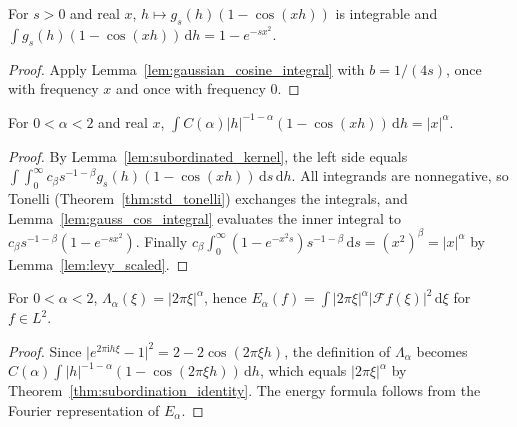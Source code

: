 \begin{lemma}\label{lem:gauss_cos_integral}
\leanok
For $s > 0$ and real $x$, $h \mapsto g_s(h)(1 - \cos(xh))$ is integrable and $\int g_s(h)(1 - \cos(xh))\, \mathrm{d}h = 1 - e^{-s x^2}$.
\end{lemma}

\begin{proof}
\leanok
Apply Lemma~\ref{lem:gaussian_cosine_integral} with $b = 1/(4s)$, once with frequency $x$ and once with frequency $0$.
\end{proof}

\begin{theorem}\label{thm:subordination_identity}
\leanok
For $0 < \alpha < 2$ and real $x$, $\int C(\alpha) \lvert h \rvert^{-1-\alpha} (1 - \cos(xh))\, \mathrm{d}h = \lvert x \rvert^\alpha$.
\end{theorem}

\begin{proof}
\leanok
By Lemma~\ref{lem:subordinated_kernel}, the left side equals $\int \int_0^\infty c_\beta s^{-1-\beta} g_s(h)(1 - \cos(xh))\, \mathrm{d}s\, \mathrm{d}h$. All integrands are nonnegative, so Tonelli (Theorem~\ref{thm:std_tonelli}) exchanges the integrals, and Lemma~\ref{lem:gauss_cos_integral} evaluates the inner integral to $c_\beta s^{-1-\beta}(1 - e^{-s x^2})$. Finally $c_\beta \int_0^\infty (1 - e^{-x^2 s}) s^{-1-\beta}\, \mathrm{d}s = (x^2)^\beta = \lvert x \rvert^\alpha$ by Lemma~\ref{lem:levy_scaled}.
\end{proof}

\begin{theorem}\label{thm:exact_symbol}
\leanok
For $0 < \alpha < 2$, $\Lambda_\alpha(\xi) = \lvert 2\pi\xi \rvert^\alpha$, hence $E_\alpha(f) = \int \lvert 2\pi\xi \rvert^\alpha \lvert \mathcal{F} f(\xi) \rvert^2\, \mathrm{d}\xi$ for $f \in L^2$.
\end{theorem}

\begin{proof}
\leanok
Since $\lvert e^{2\pi \mathrm{i} h \xi} - 1 \rvert^2 = 2 - 2\cos(2\pi \xi h)$, the definition of $\Lambda_\alpha$ becomes $C(\alpha) \int \lvert h \rvert^{-1-\alpha}(1 - \cos(2\pi\xi h))\, \mathrm{d}h$, which equals $\lvert 2\pi\xi \rvert^\alpha$ by Theorem~\ref{thm:subordination_identity}. The energy formula follows from the Fourier representation of $E_\alpha$.
\end{proof}
